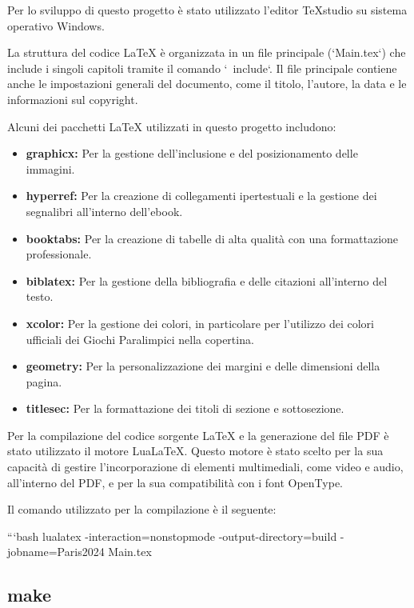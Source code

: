 \documentclass[a4paper,12pt]{report}
\begin{document}
Per lo sviluppo di questo progetto è stato utilizzato l'editor TeXstudio su sistema operativo Windows. 
					
La struttura del codice LaTeX è organizzata in un file principale (`Main.tex`) che include i singoli capitoli tramite il comando `\ include`. Il file principale contiene anche le impostazioni generali del documento, come il titolo, l'autore, la data e le informazioni sul copyright.
					
Alcuni dei pacchetti LaTeX utilizzati in questo progetto includono:
					
\begin{itemize}
	\item \textbf{graphicx:} Per la gestione dell'inclusione e del posizionamento delle immagini.
	\item \textbf{hyperref:} Per la creazione di collegamenti ipertestuali e la gestione dei segnalibri all'interno dell'ebook.
	\item \textbf{booktabs:} Per la creazione di tabelle di alta qualità con una formattazione professionale.
	\item \textbf{biblatex:} Per la gestione della bibliografia e delle citazioni all'interno del testo.
	\item \textbf{xcolor:} Per la gestione dei colori, in particolare per l'utilizzo dei colori ufficiali dei Giochi Paralimpici nella copertina.
	\item \textbf{geometry:} Per la personalizzazione dei margini e delle dimensioni della pagina.
	\item \textbf{titlesec:} Per la formattazione dei titoli di sezione e sottosezione.
\end{itemize}
					
Per la compilazione del codice sorgente LaTeX e la generazione del file PDF è stato utilizzato il motore LuaLaTeX. Questo motore è stato scelto per la sua capacità di gestire l'incorporazione di elementi multimediali, come video e audio, all'interno del PDF, e per la sua compatibilità con i font OpenType.
					
Il comando utilizzato per la compilazione è il seguente:
					
```bash
lualatex -interaction=nonstopmode -output-directory=build -jobname=Paris2024 Main.tex
					
\subsection{make}
					
\end{document}
